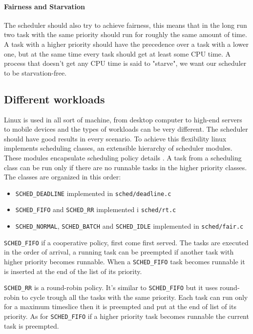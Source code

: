 \documentclass[10pt]{book}
\begin{document}
\paragraph{Fairness and Starvation}
The scheduler should also try to achieve fairness, this means that in the long run two task with the same priority should run for roughly the same amount of time. A task with a higher priority should have the precedence over a task with a lower one, but at the same time every task should get at least some CPU time. A process that doesn't get any CPU time is said to "starve", we want our scheduler to be starvation-free.

\subsection{Different workloads}
Linux is used in all sort of machine, from desktop computer to high-end servers to mobile devices and the types of workloads can be very different. The scheduler should have good results in every scenario. To achieve this flexibility linux implements scheduling classes, an extensible hierarchy of scheduler modules. These modules encapsulate scheduling policy details \cite{CFS_announcement}. A task from a scheduling class can be run only if there are no runnable tasks in the higher priority classes. The classes are organized in this order: 
\begin{itemize}
    \item \verb|SCHED_DEADLINE| implemented in \verb|sched/deadline.c|
    \item \verb|SCHED_FIFO| and \verb|SCHED_RR| implemented i \verb|sched/rt.c|
    \item \verb|SCHED_NORMAL|, \verb|SCHED_BATCH| and \verb|SCHED_IDLE| \newline implemented in \verb|sched/fair.c|%
\end{itemize}

\verb|SCHED_FIFO| if a cooperative policy, first come first served. The tasks are executed in the order of arrival, a running task can be preempted if another task with higher priority becomes runnable. When a \verb|SCHED_FIFO| task becomes runnable it is inserted at the end of the list of its priority.

\verb|SCHED_RR| is a round-robin policy. It's similar to \verb|SCHED_FIFO| but it uses round-robin to cycle trough all the tasks with the same priority. Each task can run only for a maximum timeslice then it is preempted and put at the end of list of its priority. As for \verb|SCHED_FIFO| if a higher priority task becomes runnable the current task is preempted.
\end{document}
